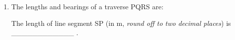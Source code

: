 \documentclass[journal]{IEEEtran}
\begin{document}
\begin{enumerate}
\item The lengths and bearings of a traverse PQRS are: 



The length of line segment SP (in m, \textit{round off to two decimal places}) is \_\_\_\_\_\_\_\_\_\_\_\_ . \hfill {}


\end{enumerate}
\end{document}
